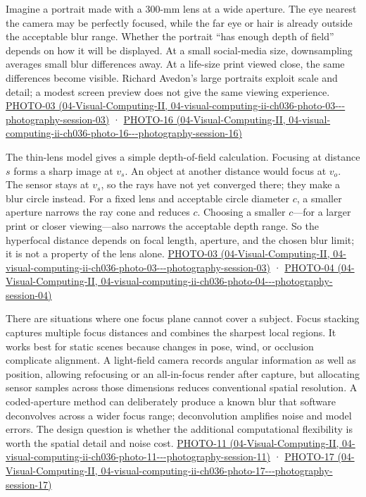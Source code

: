 Imagine a portrait made with a 300-mm lens at a wide aperture. The eye nearest the camera may be perfectly focused, while the far eye or hair is already outside the acceptable blur range. Whether the portrait ``has enough depth of field'' depends on how it will be displayed. At a small social-media size, downsampling averages small blur differences away. At a life-size print viewed close, the same differences become visible. Richard Avedon's large portraits exploit scale and detail; a modest screen preview does not give the same viewing experience. \href{../04-Visual-Computing-II/main.pdf\#nameddest=04-visual-computing-ii-ch036-photo-03---photography-session-03}{PHOTO-03 (04-Visual-Computing-II, 04-visual-computing-ii-ch036-photo-03-\/-\/-photography-session-03)} · \href{../04-Visual-Computing-II/main.pdf\#nameddest=04-visual-computing-ii-ch036-photo-16---photography-session-16}{PHOTO-16 (04-Visual-Computing-II, 04-visual-computing-ii-ch036-photo-16-\/-\/-photography-session-16)}

The thin-lens model gives a simple depth-of-field calculation. Focusing at distance \(s\) forms a sharp image at \(v_s\). An object at another distance would focus at \(v_o\). The sensor stays at \(v_s\), so the rays have not yet converged there; they make a blur circle instead. For a fixed lens and acceptable circle diameter \(c\), a smaller aperture narrows the ray cone and reduces \(c\). Choosing a smaller \(c\)---for a larger print or closer viewing---also narrows the acceptable depth range. So the hyperfocal distance depends on focal length, aperture, and the chosen blur limit; it is not a property of the lens alone. \href{../04-Visual-Computing-II/main.pdf\#nameddest=04-visual-computing-ii-ch036-photo-03---photography-session-03}{PHOTO-03 (04-Visual-Computing-II, 04-visual-computing-ii-ch036-photo-03-\/-\/-photography-session-03)} · \href{../04-Visual-Computing-II/main.pdf\#nameddest=04-visual-computing-ii-ch036-photo-04---photography-session-04}{PHOTO-04 (04-Visual-Computing-II, 04-visual-computing-ii-ch036-photo-04-\/-\/-photography-session-04)}

There are situations where one focus plane cannot cover a subject. Focus stacking captures multiple focus distances and combines the sharpest local regions. It works best for static scenes because changes in pose, wind, or occlusion complicate alignment. A light-field camera records angular information as well as position, allowing refocusing or an all-in-focus render after capture, but allocating sensor samples across those dimensions reduces conventional spatial resolution. A coded-aperture method can deliberately produce a known blur that software deconvolves across a wider focus range; deconvolution amplifies noise and model errors. The design question is whether the additional computational flexibility is worth the spatial detail and noise cost. \href{../04-Visual-Computing-II/main.pdf\#nameddest=04-visual-computing-ii-ch036-photo-11---photography-session-11}{PHOTO-11 (04-Visual-Computing-II, 04-visual-computing-ii-ch036-photo-11-\/-\/-photography-session-11)} · \href{../04-Visual-Computing-II/main.pdf\#nameddest=04-visual-computing-ii-ch036-photo-17---photography-session-17}{PHOTO-17 (04-Visual-Computing-II, 04-visual-computing-ii-ch036-photo-17-\/-\/-photography-session-17)}

